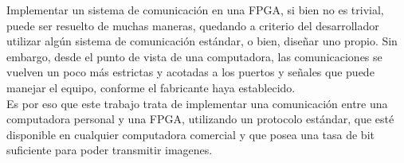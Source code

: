 Implementar un sistema de comunicación en una FPGA, si bien no es trivial, puede ser resuelto de muchas maneras, quedando a criterio del desarrollador utilizar algún sistema de comunicación estándar, o bien, diseñar uno propio. Sin embargo, desde el punto de vista de una computadora, las comunicaciones se vuelven un poco más estrictas y acotadas a los puertos y señales que puede manejar el equipo, conforme el fabricante haya establecido.\\

Es por eso que este trabajo trata de implementar una comunicación entre una computadora personal y una FPGA, utilizando un protocolo estándar, que esté disponible en cualquier computadora comercial y que posea una tasa de bit suficiente para poder transmitir imagenes.\\



%
%
%
%
%
%
%
%
%




